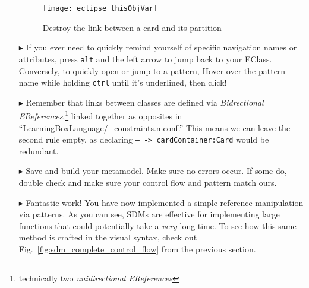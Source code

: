 \begin{itemize}
\vspace{0.5cm}

\begin{figure}[htp]
\begin{center}
  \texttt{[image: eclipse\_thisObjVar]}
  \caption{Destroy the link between a card and its partition}
  \label{fig:deleteReference}
\end{center}
\end{figure}

\item[$\blacktriangleright$] If you ever need to quickly remind yourself of specific navigation names or attributes, press \texttt{alt} and the left arrow to
jump back to your EClass. Conversely, to quickly open or jump to a pattern, Hover over the pattern name while holding \texttt{ctrl} until it's underlined,
then click!

\vspace{0.5cm}

\item[$\blacktriangleright$] Remember that links between classes are defined via \emph{Bidrectional EReferences},\footnote{technically two
\emph{unidirectional EReferences}} linked together as opposites in ``LearningBoxLanguage/\_con\-straints.mconf.'' This means we can leave the second rule empty,
as declaring \texttt{-- -> cardContainer:Card} would be redundant.

\vspace{0.5cm}

\item[$\blacktriangleright$] Save and build your metamodel. Make sure no errors occur. If some do, double check and make sure your control flow and pattern
match ours. 

\vspace{0.5cm}

\item[$\blacktriangleright$] Fantastic work! You have now implemented a simple reference manipulation via patterns. As you can see, SDMs are effective for
implementing large functions that could potentially take a \emph{very} long time. To see how this same method is crafted in the visual syntax, check out
Fig.~\ref{fig:sdm_complete_control_flow} from the previous section.

\end{itemize}
